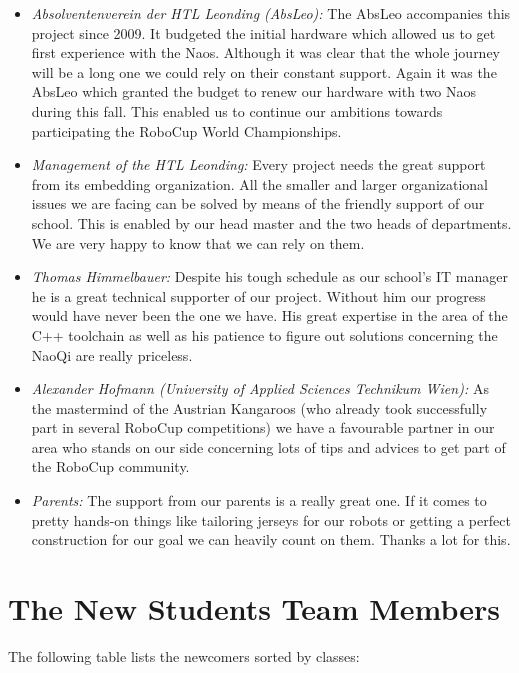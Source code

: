 \documentclass[11pt]{article}
\begin{document}
\begin{itemize}
	\item \emph{Absolventenverein der HTL Leonding (AbsLeo):} The AbsLeo accompanies this project since 2009. It budgeted the initial hardware which allowed us to get first experience with the Naos. Although it was clear that the whole journey will be a long one we could rely on their constant support. Again it was the AbsLeo which granted the budget to renew our hardware with two Naos during this fall. This enabled us to continue our ambitions towards participating the RoboCup World Championships.
	
	\item \emph{Management of the HTL Leonding:} Every project needs the great support from its embedding organization. All the smaller and larger organizational issues we are facing can be solved by means of the friendly support of our school. This is enabled by our head master and the two heads of departments. We are very happy to know that we can rely on them.
	
	\item \emph{Thomas Himmelbauer:} Despite his tough schedule as our school's IT manager he is a great technical supporter of our project. Without him our progress would have never been the one we have. His great expertise in the area of the C++ toolchain as well as his patience to figure out solutions concerning the NaoQi are really priceless.

	
	\item \emph{Alexander Hofmann (University of Applied Sciences Technikum Wien):} As the mastermind of the Austrian Kangaroos (who already took successfully part in several RoboCup competitions) we have a favourable partner in our area who stands on our side concerning lots of tips and advices to get part of the RoboCup community.
	
	\item \emph{Parents:} The support from our parents is a really great one. If it comes to pretty hands-on things like tailoring jerseys for our robots or getting a perfect construction for our goal we can heavily count on them. Thanks a lot for this.
\end{itemize}

\appendix
\section{The New Students Team Members}
The following table lists the newcomers sorted by classes: \\
\end{document}
